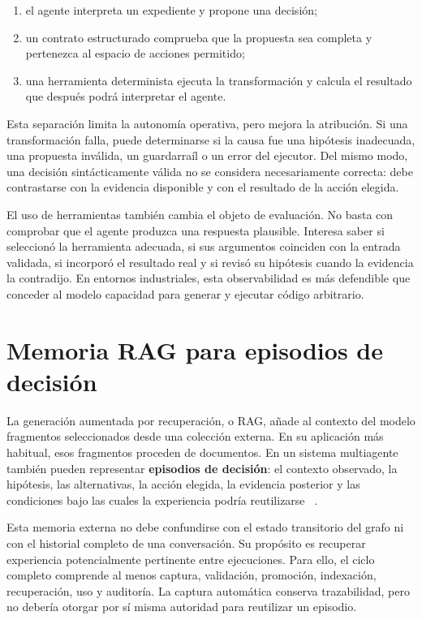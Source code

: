 \begin{enumerate}
  \item el agente interpreta un expediente y propone una decisión;
  \item un contrato estructurado comprueba que la propuesta sea completa y
        pertenezca al espacio de acciones permitido;
  \item una herramienta determinista ejecuta la transformación y calcula el
        resultado que después podrá interpretar el agente.
\end{enumerate}

Esta separación limita la autonomía operativa, pero mejora la atribución. Si una
transformación falla, puede determinarse si la causa fue una hipótesis
inadecuada, una propuesta inválida, un guardarraíl o un error del ejecutor. Del
mismo modo, una decisión sintácticamente válida no se considera necesariamente
correcta: debe contrastarse con la evidencia disponible y con el resultado de
la acción elegida.

El uso de herramientas también cambia el objeto de evaluación. No basta con
comprobar que el agente produzca una respuesta plausible. Interesa saber si
seleccionó la herramienta adecuada, si sus argumentos coinciden con la entrada
validada, si incorporó el resultado real y si revisó su hipótesis cuando la
evidencia la contradijo. En entornos industriales, esta observabilidad es más
defendible que conceder al modelo capacidad para generar y ejecutar código
arbitrario.

\section{Memoria RAG para episodios de decisión}

La generación aumentada por recuperación, o RAG, añade al contexto del modelo
fragmentos seleccionados desde una colección externa. En su aplicación más
habitual, esos fragmentos proceden de documentos. En un sistema multiagente
también pueden representar \textbf{episodios de decisión}: el contexto
observado, la hipótesis, las alternativas, la acción elegida, la evidencia
posterior y las condiciones bajo las cuales la experiencia podría reutilizarse
~\cite{lewis2020_rag,shinn2023_reflexion}.

Esta memoria externa no debe confundirse con el estado transitorio del grafo ni
con el historial completo de una conversación. Su propósito es recuperar
experiencia potencialmente pertinente entre ejecuciones. Para ello, el ciclo
completo comprende al menos captura, validación, promoción, indexación,
recuperación, uso y auditoría. La captura automática conserva trazabilidad, pero
no debería otorgar por sí misma autoridad para reutilizar un episodio.

